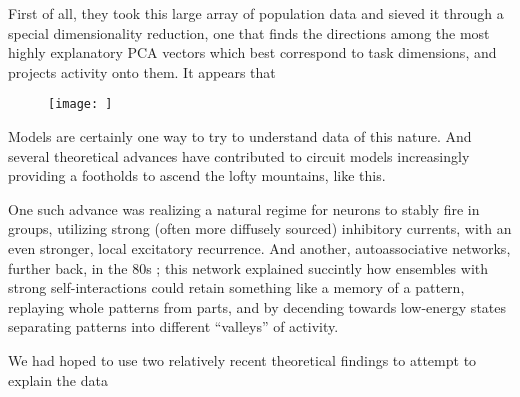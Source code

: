 \documentclass{journal}
\begin{document}
First of all, they took this large array of population data and sieved it through a special dimensionality reduction, one that finds the directions among the most highly explanatory PCA vectors which best correspond to task dimensions, and projects activity onto them. It appears that

\begin{figure}[h!]
  \texttt{[image: ]}
  \caption{}
  \label{fig:attractor}
\end{figure}

Models are certainly one way to try to understand data of this nature. And several theoretical advances have contributed to circuit models increasingly providing a footholds to ascend the lofty mountains, like this. 

One such advance \cite{tsodyks_paradoxical_1997} was realizing a natural regime for neurons to stably fire in groups, utilizing strong (often more diffusely sourced) inhibitory currents, with an even stronger, local excitatory recurrence. And another, autoassociative networks, further back, in the 80s \cite{hopfield_neural_1982}; this network explained succintly how ensembles with strong self-interactions could retain something like a memory of a pattern, replaying whole patterns from parts, and by decending towards low-energy states separating patterns into different ``valleys'' of activity.

We had hoped to use two relatively recent theoretical findings to attempt to explain the data 



\end{document}
